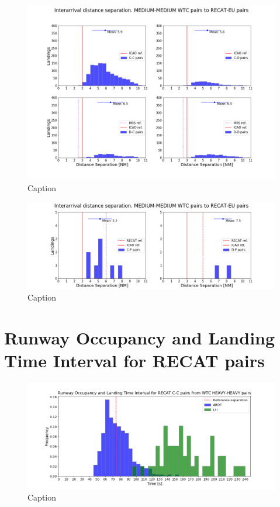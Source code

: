 \begin{figure}[h]
    \centering
    \includegraphics[width=1.0\textwidth]{graphics/fig_MM_to_RECAT_pairs_dist_separ.png}
    \caption[list of figures caption]{Caption}
    \label{fig:MM_to_RECAT_pairs_dist_separ}
\end{figure}

\begin{figure}[h]
    \centering
    \includegraphics[width=1\textwidth]{graphics/fig_MM_to_CF_and_DF_pairs_dist_separ.png}
    \caption[list of figures caption]{Caption}
    \label{fig:MM_to_CF_and_DF_pairs_dist_separ}
\end{figure}


\section{Runway Occupancy and Landing Time Interval for RECAT pairs}




\begin{figure}[h]
    \centering
    \includegraphics[width=1\textwidth]{graphics/fig_CC_from_HH_pairs_time_sep.png}
    \caption[list of figures caption]{Caption}
    \label{fig:CC_from_HH_pairs_time_sep}
\end{figure}




